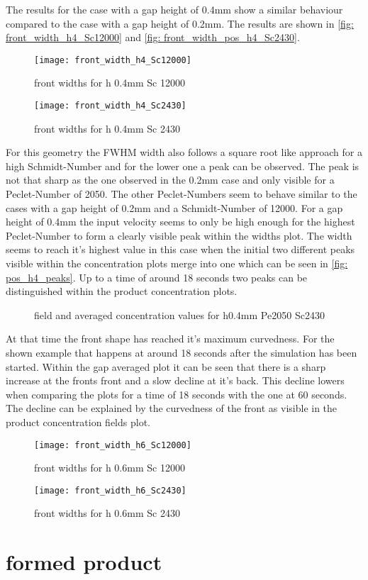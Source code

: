 \documentclass[../thesis.tex]{subfiles}
\begin{document}
The results for the case with a gap height of 0.4mm show a similar behaviour compared to the case with a gap height of 0.2mm. The results are shown in \autoref{fig: front_width_h4_Sc12000} and \autoref{fig: front_width_pos_h4_Sc2430}.
\begin{figure}[htbp]
	\centering
	\texttt{[image: front\_width\_h4\_Sc12000]}
	\caption{front widths for h 0.4mm Sc 12000\label{fig: front_width_h4_Sc12000}}\bigskip
	\texttt{[image: front\_width\_h4\_Sc2430]}
	\caption{front widths for h 0.4mm Sc 2430\label{fig: front_width_pos_h4_Sc2430}}
\end{figure}
 For this geometry the FWHM width also follows a square root like approach for a high Schmidt-Number and for the lower one a peak can be observed. The peak is not that sharp as the one observed in the 0.2mm case and only visible for a Peclet-Number of 2050. The other Peclet-Numbers seem to behave similar to the cases with a gap height of 0.2mm and a Schmidt-Number of 12000. For a gap height of 0.4mm the input velocity seems to only be high enough for the highest Peclet-Number to form a clearly visible peak within the widths plot. The width seems to reach it's highest value in this case when the initial two different peaks visible within the concentration plots merge into one which can be seen in \autoref{fig: pos_h4_peaks}. Up to a time of around 18 seconds two peaks can be distinguished within the product concentration plots. 
\begin{figure}[htb]
	\centering
	\qquad
	\caption{field and averaged concentration values for h0.4mm Pe2050 Sc2430}%
	\label{fig: pos_h4_peaks}%
\end{figure}
At that time the front shape has reached it's maximum curvedness. For the shown example that happens at around 18 seconds after the simulation has been started. Within the gap averaged plot it can be seen that there is a sharp increase at the fronts front and a slow decline at it's back. This decline lowers when comparing the plots for a time of 18 seconds with the one at 60 seconds. The decline can be explained by the curvedness of the front as visible in the product concentration fields plot.



\begin{figure}[htbp]
	\centering
	\texttt{[image: front\_width\_h6\_Sc12000]}
	\caption{front widths for h 0.6mm Sc 12000\label{fig: front_width_h6_Sc12000}}\bigskip
	\texttt{[image: front\_width\_h6\_Sc2430]}
	\caption{front widths for h 0.6mm Sc 2430\label{fig: front_width_pos_h6_Sc2430}}
\end{figure}

\section{formed product}
\end{document}
